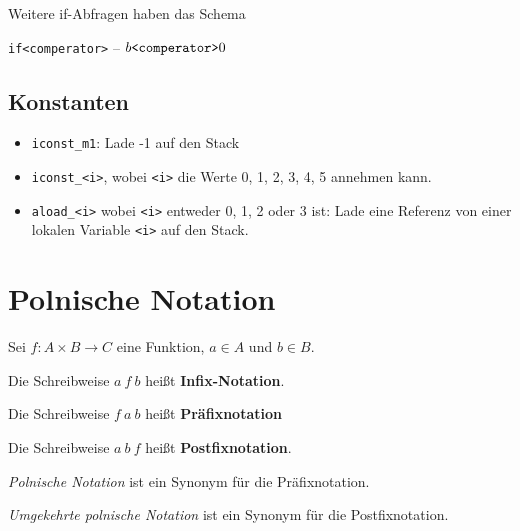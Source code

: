 Weitere if-Abfragen haben das Schema

\begin{center}
    \texttt{if<comperator>} -- $b \text{\texttt{<comperator>}} 0$
\end{center}

\subsection{Konstanten}%
\begin{itemize}
    \item \texttt{iconst\_m1}: Lade -1 auf den Stack
    \item \texttt{iconst\_<i>}, wobei \texttt{<i>} die Werte 0, 1, 2, 3, 4, 5
          annehmen kann.
\end{itemize}

\begin{itemize}
    \item \texttt{aload\_<i>} wobei \texttt{<i>} entweder 0, 1, 2 oder 3 ist: Lade eine
          Referenz von einer lokalen Variable \texttt{<i>} auf den Stack.
\end{itemize}

\section{Polnische Notation}
\begin{definition}
    Sei $f: A \times B \rightarrow C$ eine Funktion, $a \in A$ und $b \in B$.

    \begin{defenum}
        \item Die Schreibweise $a\ f\ b$ heißt \textbf{Infix-Notation}.
        \item Die Schreibweise $f\ a\ b$ heißt \textbf{Präfixnotation}
        \item Die Schreibweise $a\ b\ f$ heißt \textbf{Postfixnotation}.
    \end{defenum}
\end{definition}

\textit{Polnische Notation} ist ein Synonym für die Präfixnotation.

\textit{Umgekehrte polnische Notation} ist ein Synonym für die Postfixnotation.

